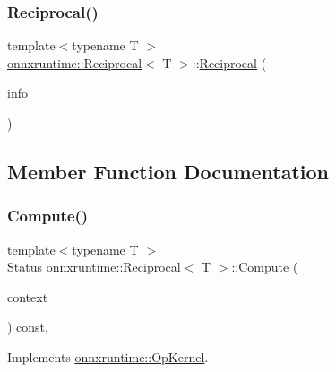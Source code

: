 \subsubsection{\texorpdfstring{Reciprocal()}{Reciprocal()}}
{\footnotesize\ttfamily template$<$typename T $>$ \\
\mbox{\hyperlink{classonnxruntime_1_1Reciprocal}{onnxruntime\+::\+Reciprocal}}$<$ T $>$\+::\mbox{\hyperlink{classonnxruntime_1_1Reciprocal}{Reciprocal}} (\begin{DoxyParamCaption}\item[{const \mbox{\hyperlink{classonnxruntime_1_1OpKernelInfo}{Op\+Kernel\+Info}} \&}]{info }\end{DoxyParamCaption})\hspace{0.3cm}{\ttfamily [inline]}}



\subsection{Member Function Documentation}
\mbox{\label{classonnxruntime_1_1Reciprocal_ae5eea4f44bee7a620e4d4ce512b8a17a}} 
\subsubsection{\texorpdfstring{Compute()}{Compute()}\hspace{0.1cm}{\footnotesize\ttfamily [1/2]}}
{\footnotesize\ttfamily template$<$typename T $>$ \\
\mbox{\hyperlink{classonnxruntime_1_1common_1_1Status}{Status}} \mbox{\hyperlink{classonnxruntime_1_1Reciprocal}{onnxruntime\+::\+Reciprocal}}$<$ T $>$\+::Compute (\begin{DoxyParamCaption}\item[{\mbox{\hyperlink{classonnxruntime_1_1OpKernelContext}{Op\+Kernel\+Context}} $\ast$}]{context }\end{DoxyParamCaption}) const\hspace{0.3cm}{\ttfamily [override]}, {\ttfamily [virtual]}}



Implements \mbox{\hyperlink{classonnxruntime_1_1OpKernel_a9eca8656a78b1b3ab9d3351a12798650}{onnxruntime\+::\+Op\+Kernel}}.

\mbox{\label{classonnxruntime_1_1Reciprocal_a2d51e18f1fcbc3f5dc8a629ac3b43e36}} 
